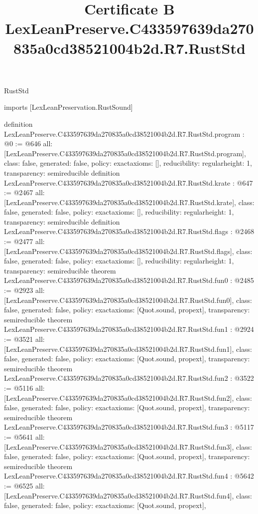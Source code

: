 \begin{lexlean}{RustStd}
\title{Certificate B LexLeanPreserve.C433597639da270835a0cd38521004b2d.R7.RustStd}
\begin{coremodule}
imports [LexLeanPreservation.RustSound]

definition LexLeanPreserve.C433597639da270835a0cd38521004b2d.R7.RustStd.program : @0 := @646 {
  all: [LexLeanPreserve.C433597639da270835a0cd38521004b2d.R7.RustStd.program],
  class: false,
  generated: false,
  policy: exact{axioms: []},
  reducibility: regular{height: 1},
  transparency: semireducible
}
definition LexLeanPreserve.C433597639da270835a0cd38521004b2d.R7.RustStd.krate : @647 := @2467 {
  all: [LexLeanPreserve.C433597639da270835a0cd38521004b2d.R7.RustStd.krate],
  class: false,
  generated: false,
  policy: exact{axioms: []},
  reducibility: regular{height: 1},
  transparency: semireducible
}
definition LexLeanPreserve.C433597639da270835a0cd38521004b2d.R7.RustStd.flags : @2468 := @2477 {
  all: [LexLeanPreserve.C433597639da270835a0cd38521004b2d.R7.RustStd.flags],
  class: false,
  generated: false,
  policy: exact{axioms: []},
  reducibility: regular{height: 1},
  transparency: semireducible
}
theorem LexLeanPreserve.C433597639da270835a0cd38521004b2d.R7.RustStd.fun0 : @2485 := @2923 {
  all: [LexLeanPreserve.C433597639da270835a0cd38521004b2d.R7.RustStd.fun0],
  class: false,
  generated: false,
  policy: exact{axioms: [Quot.sound, propext]},
  transparency: semireducible
}
theorem LexLeanPreserve.C433597639da270835a0cd38521004b2d.R7.RustStd.fun1 : @2924 := @3521 {
  all: [LexLeanPreserve.C433597639da270835a0cd38521004b2d.R7.RustStd.fun1],
  class: false,
  generated: false,
  policy: exact{axioms: [Quot.sound, propext]},
  transparency: semireducible
}
theorem LexLeanPreserve.C433597639da270835a0cd38521004b2d.R7.RustStd.fun2 : @3522 := @5116 {
  all: [LexLeanPreserve.C433597639da270835a0cd38521004b2d.R7.RustStd.fun2],
  class: false,
  generated: false,
  policy: exact{axioms: [Quot.sound, propext]},
  transparency: semireducible
}
theorem LexLeanPreserve.C433597639da270835a0cd38521004b2d.R7.RustStd.fun3 : @5117 := @5641 {
  all: [LexLeanPreserve.C433597639da270835a0cd38521004b2d.R7.RustStd.fun3],
  class: false,
  generated: false,
  policy: exact{axioms: [Quot.sound, propext]},
  transparency: semireducible
}
theorem LexLeanPreserve.C433597639da270835a0cd38521004b2d.R7.RustStd.fun4 : @5642 := @6525 {
  all: [LexLeanPreserve.C433597639da270835a0cd38521004b2d.R7.RustStd.fun4],
  class: false,
  generated: false,
  policy: exact{axioms: [Quot.sound, propext]},
}
\end{coremodule}
\end{lexlean}
